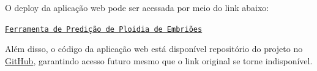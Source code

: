 O deploy da aplicação web pode ser acessada por meio do link abaixo:

\begin{center}
    \href{https://embryo-predictor.vercel.app}{\texttt{Ferramenta de Predição de Ploidia de Embriões}}
\end{center}

Além disso, o código da aplicação web está disponível repositório do projeto no \href{https://github.com/sabrinaberno/embryo-predictor}{GitHub}, garantindo acesso futuro mesmo que o link original se torne indisponível.